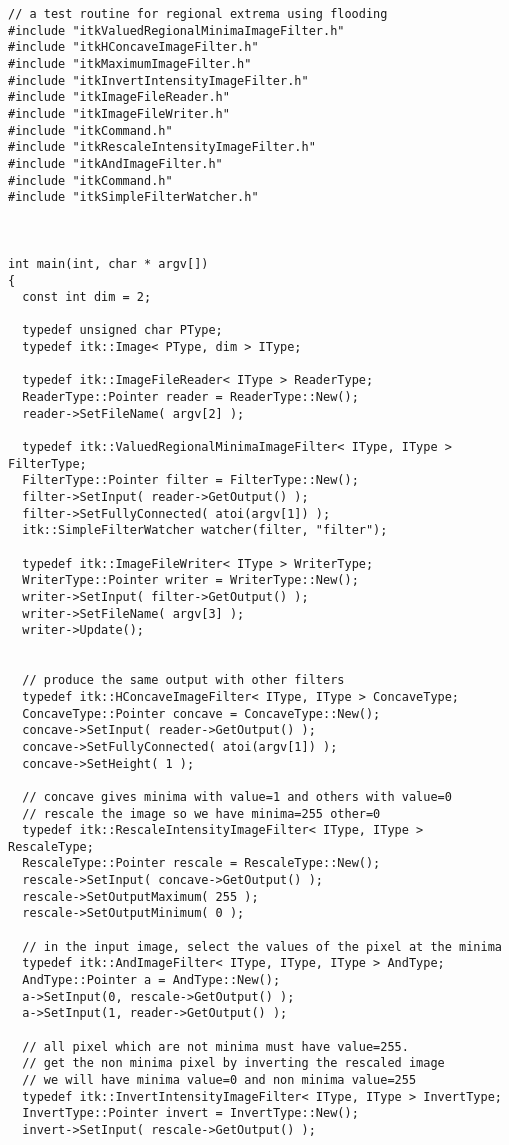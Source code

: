 \documentclass{InsightArticle}
\begin{document}
\small \begin{verbatim}
// a test routine for regional extrema using flooding
#include "itkValuedRegionalMinimaImageFilter.h"
#include "itkHConcaveImageFilter.h"
#include "itkMaximumImageFilter.h"
#include "itkInvertIntensityImageFilter.h"
#include "itkImageFileReader.h"
#include "itkImageFileWriter.h"
#include "itkCommand.h"
#include "itkRescaleIntensityImageFilter.h"
#include "itkAndImageFilter.h"
#include "itkCommand.h"
#include "itkSimpleFilterWatcher.h"



int main(int, char * argv[])
{
  const int dim = 2;
  
  typedef unsigned char PType;
  typedef itk::Image< PType, dim > IType;

  typedef itk::ImageFileReader< IType > ReaderType;
  ReaderType::Pointer reader = ReaderType::New();
  reader->SetFileName( argv[2] );

  typedef itk::ValuedRegionalMinimaImageFilter< IType, IType > FilterType;
  FilterType::Pointer filter = FilterType::New();
  filter->SetInput( reader->GetOutput() );
  filter->SetFullyConnected( atoi(argv[1]) );
  itk::SimpleFilterWatcher watcher(filter, "filter");

  typedef itk::ImageFileWriter< IType > WriterType;
  WriterType::Pointer writer = WriterType::New();
  writer->SetInput( filter->GetOutput() );
  writer->SetFileName( argv[3] );
  writer->Update();


  // produce the same output with other filters
  typedef itk::HConcaveImageFilter< IType, IType > ConcaveType;
  ConcaveType::Pointer concave = ConcaveType::New();
  concave->SetInput( reader->GetOutput() );
  concave->SetFullyConnected( atoi(argv[1]) );
  concave->SetHeight( 1 );

  // concave gives minima with value=1 and others with value=0
  // rescale the image so we have minima=255 other=0
  typedef itk::RescaleIntensityImageFilter< IType, IType > RescaleType;
  RescaleType::Pointer rescale = RescaleType::New();
  rescale->SetInput( concave->GetOutput() );
  rescale->SetOutputMaximum( 255 );
  rescale->SetOutputMinimum( 0 );

  // in the input image, select the values of the pixel at the minima
  typedef itk::AndImageFilter< IType, IType, IType > AndType;
  AndType::Pointer a = AndType::New();
  a->SetInput(0, rescale->GetOutput() );
  a->SetInput(1, reader->GetOutput() );

  // all pixel which are not minima must have value=255.
  // get the non minima pixel by inverting the rescaled image
  // we will have minima value=0 and non minima value=255
  typedef itk::InvertIntensityImageFilter< IType, IType > InvertType;
  InvertType::Pointer invert = InvertType::New();
  invert->SetInput( rescale->GetOutput() );


\end{verbatim}
\end{document}

